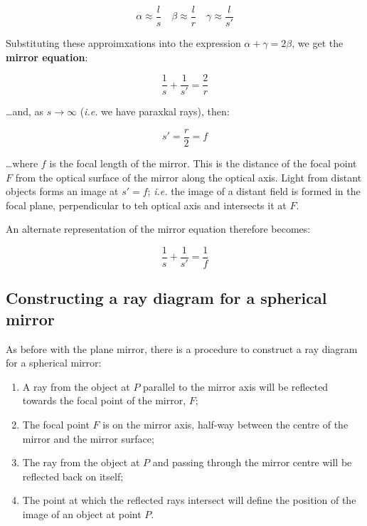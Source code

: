 \documentclass[
]{book}
\providecommand{\tightlist}{%
  \setlength{\itemsep}{0pt}\setlength{\parskip}{0pt}}
\begin{document}
\begin{equation}
\alpha \approx \frac{l}{s} \quad \beta \approx \frac{l}{r} \quad \gamma \approx \frac{l}{s'}
\end{equation}

Substituting these approimxations into the expression \(\alpha + \gamma = 2\beta\), we get the \textbf{mirror equation}:

\begin{equation}
\frac{1}{s} + \frac{1}{s'} = \frac{2}{r}
\end{equation}

\ldots and, as \(s \rightarrow \infty\) (\emph{i.e.} we have paraxkal rays), then:

\begin{equation}
s' = \frac{r}{2} = f
\end{equation}

\ldots where \(f\) is the focal length of the mirror. This is the distance of the focal point \(F\) from the optical surface of the mirror along the optical axis. Light from distant objects forms an image at \(s' = f\); \emph{i.e.} the image of a distant field is formed in the focal plane, perpendicular to teh optical axis and intersects it at \(F\).

An alternate representation of the mirror equation therefore becomes:

\begin{equation}
\frac{1}{s} + \frac{1}{s'} = \frac{1}{f}
\label{eq:ch15-mirrorequation1}
\end{equation}

\hypertarget{sec:ch15-raydiagramconcavesphericalmirror}{%
\subsection{Constructing a ray diagram for a spherical mirror}\label{sec:ch15-raydiagramconcavesphericalmirror}}

As before with the plane mirror, there is a procedure to construct a ray diagram for a spherical mirror:

\begin{enumerate}
\def\labelenumi{\arabic{enumi}.}
\tightlist
\item
  A ray from the object at \(P\) parallel to the mirror axis will be reflected towards the focal point of the mirror, \(F\);
\item
  The focal point \(F\) is on the mirror axis, half-way between the centre of the mirror and the mirror surface;
\item
  The ray from the object at \(P\) and passing through the mirror centre will be reflected back on itself;
\item
  The point at which the reflected rays intersect will define the position of the image of an object at point \(P\).
\end{enumerate}
\end{document}
